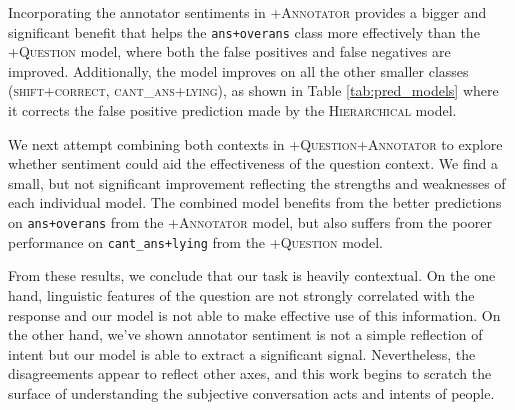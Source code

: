 Incorporating the annotator sentiments in \textsc{+Annotator} provides a bigger and significant benefit that helps the \texttt{ans+overans} class more effectively than the \textsc{+Question} model, where both the false positives and false negatives are improved. Additionally, the model improves on all the other smaller classes (\textsc{shift+correct}, \textsc{cant\_ans+lying}), as shown in Table \ref{tab:pred_models} where it corrects the false positive prediction made by the \textsc{Hierarchical} model.

We next attempt combining both contexts in \textsc{+Question+Annotator} to explore whether sentiment could aid the effectiveness of the question context. We find a small, but not significant improvement reflecting the strengths and weaknesses of each individual model. The combined model benefits from the better predictions on \texttt{ans+overans} from the \textsc{+Annotator} model, but also suffers from the poorer performance on \texttt{cant\_ans+lying} from the \textsc{+Question} model.

From these results, we conclude that our task is heavily contextual. On the one hand, linguistic features of the question are not strongly correlated with the response and our model is not able to make effective use of this information. On the other hand, we've shown annotator sentiment is not a simple reflection of intent but our model is able to extract a significant signal. Nevertheless, the disagreements appear to reflect other axes, and this work begins to scratch the surface of understanding the subjective conversation acts and intents of people.

